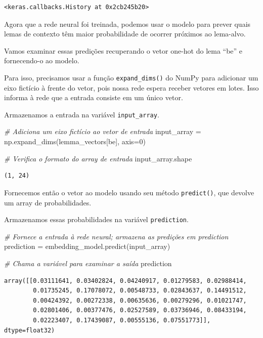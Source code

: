 \documentclass[
  brazilian,
]{article}
\newenvironment{Shaded}{}{}
\newcommand{\CommentTok}[1]{\textcolor[rgb]{0.38,0.63,0.69}{\textit{#1}}}
\newcommand{\DecValTok}[1]{\textcolor[rgb]{0.25,0.63,0.44}{#1}}
\newcommand{\NormalTok}[1]{#1}
\newcommand{\OperatorTok}[1]{\textcolor[rgb]{0.40,0.40,0.40}{#1}}
\newcommand{\StringTok}[1]{\textcolor[rgb]{0.25,0.44,0.63}{#1}}
\begin{document}
\begin{verbatim}
<keras.callbacks.History at 0x2cb245b20>
\end{verbatim}

Agora que a rede neural foi treinada, podemos usar o modelo para prever
quais lemas de contexto têm maior probabilidade de ocorrer próximos ao
lema-alvo.

Vamos examinar essas predições recuperando o vetor one-hot do lema
``be'' e fornecendo-o ao modelo.

Para isso, precisamos usar a função \texttt{expand\_dims()} do NumPy
para adicionar um eixo fictício à frente do vetor, pois nossa rede
espera receber vetores em lotes. Isso informa à rede que a entrada
consiste em um único vetor.

Armazenamos a entrada na variável \texttt{input\_array}.

\begin{Shaded}
\begin{Highlighting}[]
\CommentTok{\# Adiciona um eixo fictício ao vetor de entrada}
\NormalTok{input\_array }\OperatorTok{=}\NormalTok{ np.expand\_dims(lemma\_vectors[}\StringTok{\textquotesingle{}be\textquotesingle{}}\NormalTok{], axis}\OperatorTok{=}\DecValTok{0}\NormalTok{)}

\CommentTok{\# Verifica o formato do array de entrada}
\NormalTok{input\_array.shape}
\end{Highlighting}
\end{Shaded}

\begin{verbatim}
(1, 24)
\end{verbatim}

Fornecemos então o vetor ao modelo usando seu método \texttt{predict()},
que devolve um array de probabilidades.

Armazenamos essas probabilidades na variável \texttt{prediction}.

\begin{Shaded}
\begin{Highlighting}[]
\CommentTok{\# Fornece a entrada à rede neural; armazena as predições em \textquotesingle{}prediction\textquotesingle{}}
\NormalTok{prediction }\OperatorTok{=}\NormalTok{ embedding\_model.predict(input\_array)}

\CommentTok{\# Chama a variável para examinar a saída}
\NormalTok{prediction}
\end{Highlighting}
\end{Shaded}

\begin{verbatim}
array([[0.03111641, 0.03402824, 0.04240917, 0.01279583, 0.02988414,
        0.01735245, 0.17078072, 0.00548733, 0.02843637, 0.14491512,
        0.00424392, 0.00272338, 0.00635636, 0.00279296, 0.01021747,
        0.02801406, 0.00377476, 0.02527589, 0.03736946, 0.08433194,
        0.02223407, 0.17439087, 0.00555136, 0.07551773]], dtype=float32)
\end{verbatim}
\end{document}
